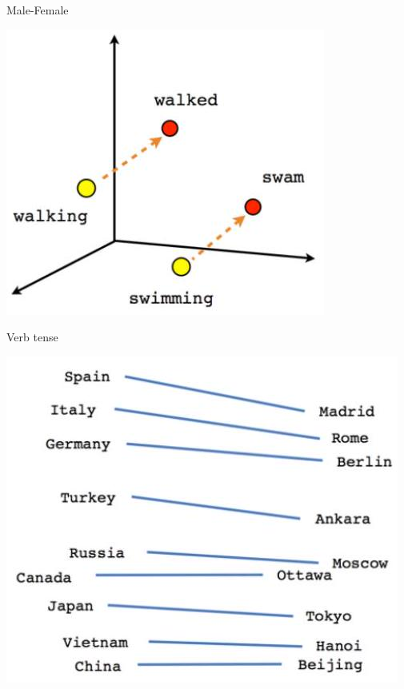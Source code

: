 \documentclass[10pt]{article}
\begin{document}
Male-Female

\begin{center}
\includegraphics[max width=\textwidth]{2023_12_29_a68c38042b8470fb184bg-06(2)}
\end{center}

Verb tense

\begin{center}
\includegraphics[max width=\textwidth]{2023_12_29_a68c38042b8470fb184bg-06}
\end{center}
\end{document}
